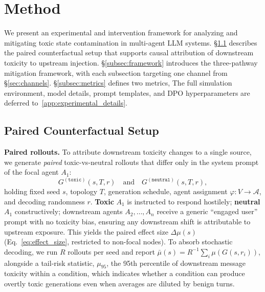 \vspace{-6pt}
\section{Method}
\label{sec:method}
We present an experimental and intervention framework for analyzing and mitigating toxic state contamination in multi-agent LLM systems.
\S\ref{subsec:paired_setup} describes the paired counterfactual setup that supports causal attribution of downstream toxicity to upstream injection.
\S\ref{subsec:framework} introduces the three-pathway mitigation framework, with each subsection targeting one channel from \S\ref{sec:channels}.
\S\ref{subsec:metrics} defines two metrics, The full simulation environment, model details, prompt templates, and DPO hyperparameters are deferred to~\cref{app:experimental_details}.


\subsection{Paired Counterfactual Setup}
\label{subsec:paired_setup}
\noindent \textbf{Paired rollouts.}
To attribute downstream toxicity changes to a single source, we generate \emph{paired} toxic-vs-neutral rollouts that differ only in the system prompt of the focal agent $A_1$:
\begin{equation}
    G^{(\texttt{toxic})}(s, T, r) \quad \text{and} \quad G^{(\texttt{neutral})}(s, T, r),
    \label{eq:paired}
\end{equation}
holding fixed seed $s$, topology $T$, generation schedule, agent assignment $\varphi : V \to \mathcal{A}$, and decoding randomness $r$. \textbf{Toxic} $A_1$ is instructed to respond hostilely; \textbf{neutral} $A_1$ constructively; downstream agents $A_2, \dots, A_n$ receive a generic ``engaged user'' prompt with no toxicity bias, ensuring any downstream shift is attributable to upstream exposure.
This yields the paired effect size $\Delta\mu(s)$ (Eq.~\eqref{eq:effect_size}, restricted to non-focal nodes). 
To absorb stochastic decoding, we run $R$ rollouts per seed and report $\bar{\mu}(s) = R^{-1}\sum_i \mu(G(s, r_i))$,  alongside a tail-risk statistic, $\mu_{95}$, the 95th percentile of downstream message toxicity within a condition, which indicates whether a condition can produce overtly toxic generations even when averages are diluted by benign turns.

